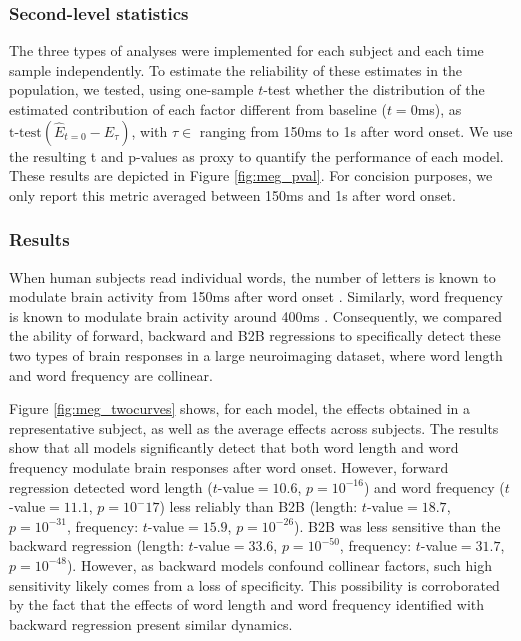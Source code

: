 \subsubsection{Second-level statistics}

The three types of analyses were implemented for each subject and each time
sample independently. To estimate the reliability of these estimates in the
population, we tested, using one-sample $t$-test whether the distribution of
the estimated contribution of each factor different from baseline ($t=0$ms),
as $\text{t-test}(\hat E_{t=0} - \hat E_{\tau})$, with $\tau \in $ ranging from
150ms to 1s after word onset. We use the resulting t and p-values as proxy to
quantify the performance of each model. These results are depicted in Figure
\ref{fig:meg_pval}. For concision purposes, we only report this metric averaged
between 150ms and 1s after word onset.

\subsubsection{Results}
When human subjects read individual words, the number of letters is known to modulate
brain activity from 150ms after word onset \citep{pegado2014timing}.
Similarly, word frequency is known to modulate brain activity around 400ms
\citep{kutas2011thirty}. Consequently, we compared the ability of forward, backward and B2B regressions to specifically detect these two types of brain responses in a large neuroimaging dataset, where word length and word frequency are collinear.

Figure \ref{fig:meg_twocurves} shows, for each model, the effects obtained
in a representative subject, as well as the average effects across subjects.
The results show that all models significantly detect that both word length and
word frequency modulate brain responses after word onset. However,
forward regression detected word length ($t$-value$=10.6$, $p=10^{-16}$) and
word frequency ($t$-value$=11.1$, $p=10^-17$) less reliably than B2B (length:
$t$-value$=18.7$, $p=10^{-31}$, frequency: $t$-value$=15.9$, $p=10^{-26}$). B2B
was less sensitive than the backward regression (length: $t$-value$=33.6$,
$p=10^{-50}$, frequency: $t$-value$=31.7$, $p=10^{-48}$). However, as backward models confound collinear factors, such high sensitivity likely comes from a loss of specificity. This possibility is corroborated by the fact that the effects of word length and word frequency identified with backward regression present similar dynamics.

